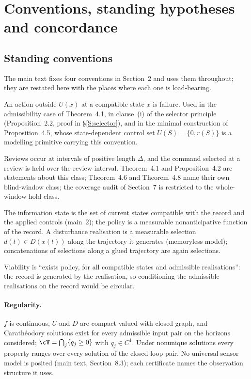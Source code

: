 \section{Conventions, standing hypotheses and concordance}\label{S:conventions}

\subsection{Standing conventions}
The main text fixes four conventions in Section~2 and uses them throughout; they are restated here with the places where each one is load-bearing.

\begin{description}[leftmargin=1.6em,itemsep=2pt]
\item[(Fail)] An action outside $U(x)$ at a compatible state $x$ is failure. Used in the admissibility case of Theorem~4.1, in clause~(i) of the selector principle (Proposition~2.2, proof in \S\ref{S:selector}), and in the minimal construction of Proposition~4.5, whose state-dependent control set $U(S)=\{0,r(S)\}$ is a modelling primitive carrying this convention.
\item[(Hold)] Reviews occur at intervals of positive length $\Delta$, and the command selected at a review is held over the review interval. Theorem~4.1 and Proposition~4.2 are statements about this class; Theorem~4.6 and Theorem~4.8 name their own blind-window class; the coverage audit of Section~7 is restricted to the whole-window hold class.
\item[(Record)] The information state is the set of current states compatible with the record and the applied controls (main~2); the policy is a measurable nonanticipative function of the record. A disturbance realisation is a measurable selection $d(t)\in D(x(t))$ along the trajectory it generates (memoryless model); concatenations of selections along a glued trajectory are again selections.
\item[(Order)] Viability is ``exists policy, for all compatible states and admissible realisations'': the record is generated by the realisation, so conditioning the admissible realisations on the record would be circular.
\end{description}

\paragraph{Regularity.} $f$ is continuous, $U$ and $D$ are compact-valued with closed graph, and Carath\'eodory solutions exist for every admissible input pair on the horizons considered; $\cV=\bigcap_j\{q_j\ge0\}$ with $q_j\in C^1$. Under nonunique solutions every property ranges over every solution of the closed-loop pair. No universal sensor model is posited (main text, Section~8.3); each certificate names the observation structure it uses.

